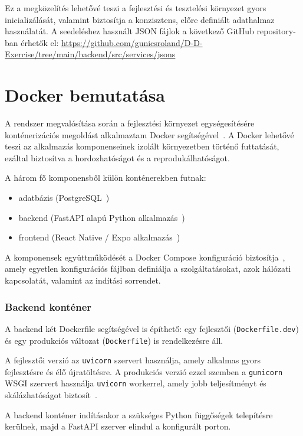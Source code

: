 \documentclass[
]{thesis-ekf}
\theoremstyle{definition}
\theoremstyle{remark}
\begin{document}
Ez a megközelítés lehetővé teszi a fejlesztési és tesztelési környezet gyors inicializálását, valamint biztosítja a konzisztens, előre definiált adathalmaz használatát. A seedeléshez használt JSON fájlok a következő GitHub repository-ban érhetők el:
\url{https://github.com/gunicsroland/D-D-Exercise/tree/main/backend/src/services/jsons}

\section{Docker bemutatása}

A rendszer megvalósítása során a fejlesztési környezet egységesítésére konténerizációs megoldást alkalmaztam Docker segítségével~\cite{docker}. A Docker lehetővé teszi az alkalmazás komponenseinek izolált környezetben történő futtatását, ezáltal biztosítva a hordozhatóságot és a reprodukálhatóságot.

A három fő komponensből külön konténerekben futnak:
\begin{itemize}
    \item adatbázis (PostgreSQL~\cite{postgresql})
    \item backend (FastAPI alapú Python alkalmazás~\cite{fastapi})
    \item frontend (React Native / Expo alkalmazás~\cite{react_native,expo})
\end{itemize}

A komponensek együttműködését a Docker Compose konfiguráció biztosítja~\cite{docker_compose}, amely egyetlen konfigurációs fájlban definiálja a szolgáltatásokat, azok hálózati kapcsolatát, valamint az indítási sorrendet.

\subsubsection{Backend konténer}

A backend két Dockerfile segítségével is építhető: egy fejlesztői (\texttt{Dockerfile.dev}) és egy produkciós változat (\texttt{Dockerfile}) is rendelkezésre áll.

A fejlesztői verzió az \texttt{uvicorn} szervert használja, amely alkalmas gyors fejlesztésre és élő újratöltésre. A produkciós verzió ezzel szemben a \texttt{gunicorn} WSGI szervert használja \texttt{uvicorn} workerrel, amely jobb teljesítményt és skálázhatóságot biztosít~\cite{uvicorn,gunicorn}.

A backend konténer indításakor a szükséges Python függőségek telepítésre kerülnek, majd a FastAPI szerver elindul a konfigurált porton.
\end{document}
